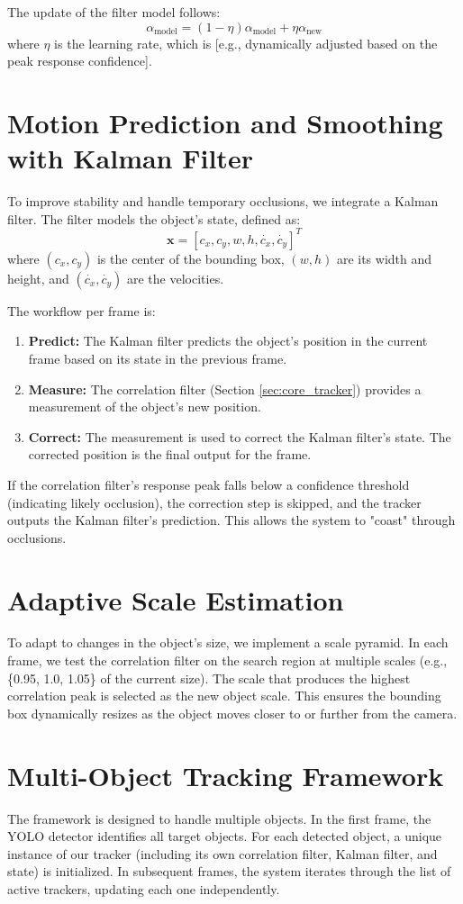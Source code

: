 \documentclass[12pt, a4paper]{report}
\begin{document}
The update of the filter model follows:
$$ \alpha_{\text{model}} = (1 - \eta) \alpha_{\text{model}} + \eta \alpha_{\text{new}} $$
where $\eta$ is the learning rate, which is [e.g., dynamically adjusted based on the peak response confidence].

\section{Motion Prediction and Smoothing with Kalman Filter}
To improve stability and handle temporary occlusions, we integrate a Kalman filter. The filter models the object's state, defined as:
$$ \mathbf{x} = [c_x, c_y, w, h, \dot{c_x}, \dot{c_y}]^T $$
where $(c_x, c_y)$ is the center of the bounding box, $(w, h)$ are its width and height, and $(\dot{c_x}, \dot{c_y})$ are the velocities.

The workflow per frame is:
\begin{enumerate}
    \item \textbf{Predict:} The Kalman filter predicts the object's position in the current frame based on its state in the previous frame.
    \item \textbf{Measure:} The correlation filter (Section \ref{sec:core_tracker}) provides a measurement of the object's new position.
    \item \textbf{Correct:} The measurement is used to correct the Kalman filter's state. The corrected position is the final output for the frame.
\end{enumerate}

If the correlation filter's response peak falls below a confidence threshold (indicating likely occlusion), the correction step is skipped, and the tracker outputs the Kalman filter's prediction. This allows the system to "coast" through occlusions.

\section{Adaptive Scale Estimation}
To adapt to changes in the object's size, we implement a scale pyramid. In each frame, we test the correlation filter on the search region at multiple scales (e.g., \{0.95, 1.0, 1.05\} of the current size). The scale that produces the highest correlation peak is selected as the new object scale. This ensures the bounding box dynamically resizes as the object moves closer to or further from the camera.

\section{Multi-Object Tracking Framework}
The framework is designed to handle multiple objects. In the first frame, the YOLO detector identifies all target objects. For each detected object, a unique instance of our tracker (including its own correlation filter, Kalman filter, and state) is initialized. In subsequent frames, the system iterates through the list of active trackers, updating each one independently.
\end{document}
